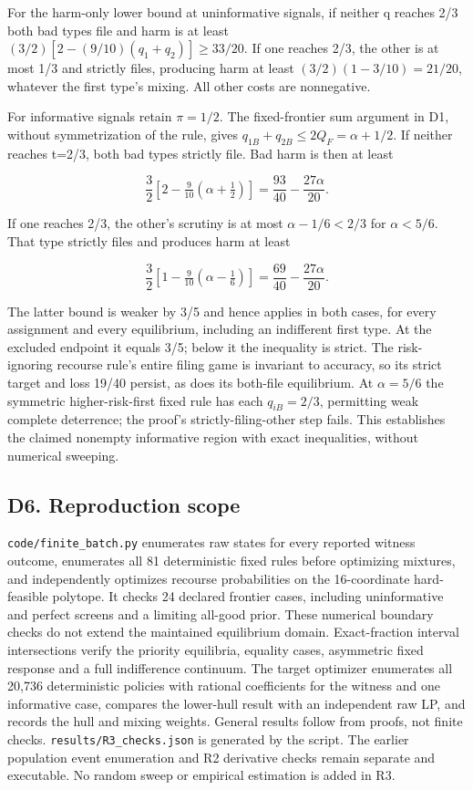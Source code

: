 \documentclass[
  11pt,
]{article}
\begin{document}
For the harm-only lower bound at uninformative signals, if neither q
reaches 2/3 both bad types file and harm is at least
\((3/2)[2-(9/10)(q_1+q_2)]\geq33/20\). If one reaches 2/3, the other is
at most 1/3 and strictly files, producing harm at least
\((3/2)(1-3/10)=21/20\), whatever the first type's mixing. All other
costs are nonnegative.

For informative signals retain \(\pi=1/2\). The fixed-frontier sum
argument in D1, without symmetrization of the rule, gives
\(q_{1B}+q_{2B}\leq2Q_F=\alpha+1/2\). If neither reaches t=2/3, both bad
types strictly file. Bad harm is then at least

\[\frac32[2-\tfrac9{10}(\alpha+\tfrac12)]
=\frac{93}{40}-\frac{27\alpha}{20}.\]

If one reaches 2/3, the other's scrutiny is at most \(\alpha-1/6<2/3\)
for \(\alpha<5/6\). That type strictly files and produces harm at least

\[\frac32[1-\tfrac9{10}(\alpha-\tfrac16)]
=\frac{69}{40}-\frac{27\alpha}{20}.\]

The latter bound is weaker by 3/5 and hence applies in both cases, for
every assignment and every equilibrium, including an indifferent first
type. At the excluded endpoint it equals 3/5; below it the inequality is
strict. The risk-ignoring recourse rule's entire filing game is
invariant to accuracy, so its strict target and loss 19/40 persist, as
does its both-file equilibrium. At \(\alpha=5/6\) the symmetric
higher-risk-first fixed rule has each \(q_{iB}=2/3\), permitting weak
complete deterrence; the proof's strictly-filing-other step fails. This
establishes the claimed nonempty informative region with exact
inequalities, without numerical sweeping.

\subsection{D6. Reproduction scope}\label{d6.-reproduction-scope}

\texttt{code/finite\_batch.py} enumerates raw states for every reported
witness outcome, enumerates all 81 deterministic fixed rules before
optimizing mixtures, and independently optimizes recourse probabilities
on the 16-coordinate hard-feasible polytope. It checks 24 declared
frontier cases, including uninformative and perfect screens and a
limiting all-good prior. These numerical boundary checks do not extend
the maintained equilibrium domain. Exact-fraction interval intersections
verify the priority equilibria, equality cases, asymmetric fixed
response and a full indifference continuum. The target optimizer
enumerates all 20,736 deterministic policies with rational coefficients
for the witness and one informative case, compares the lower-hull result
with an independent raw LP, and records the hull and mixing weights.
General results follow from proofs, not finite checks.
\texttt{results/R3\_checks.json} is generated by the script. The earlier
population event enumeration and R2 derivative checks remain separate
and executable. No random sweep or empirical estimation is added in R3.
\end{document}
